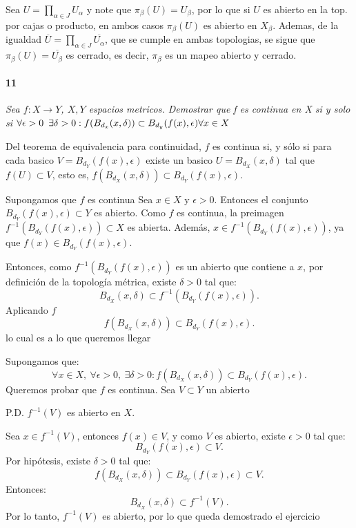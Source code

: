 \documentclass[12pt]{article}
\begin{document}
Sea $U=\prod_{\alpha \in J} U_\alpha$ y note que $\pi_\beta(U)=U_\beta$, por lo que si $U$ es abierto en la top. por cajas o producto, en ambos casos $\pi_\beta(U)$ es abierto en $X_\beta$.
Ademas, de la igualdad $\overline{U}=\prod_{\alpha \in J} \overline{U_\alpha}$, que se cumple en ambas topologias, se sigue que $\pi_\beta(U)=\overline{U_\beta}$ es cerrado, es decir, $\pi_\beta$ es un mapeo abierto y cerrado.
\paragraph{11}
\textit{Sea $f:X \to Y$, $X,Y$ espacios metricos. Demostrar que f es continua en X si y solo si $\forall\epsilon>0\hspace{5px}\exists\delta>0 : f(B_{d_x}(x,\delta))\subset B_{d_y}(f(x),\epsilon) \forall x\in X$}

Del teorema de equivalencia para continuidad, $f$ es continua si, y sólo si para cada basico $V=B_{d_Y}(f(x),\epsilon)$ existe un basico $U=B_{d_X}(x,\delta)$ tal que $f(U) \subset V$, esto es, $f(B_{d_X}(x,\delta)) \subset B_{d_Y}(f(x),\epsilon)$.

\vspace{1em}
Supongamos que \( f \) es continua
Sea \( x \in X \) y \( \epsilon > 0 \). Entonces el conjunto \( B_{d_Y}(f(x), \epsilon) \subset Y \) es abierto.  
Como \( f \) es continua, la preimagen \( f^{-1}(B_{d_Y}(f(x), \epsilon)) \subset X \) es abierta.  
Además, \( x \in f^{-1}(B_{d_Y}(f(x), \epsilon)) \), ya que \( f(x) \in B_{d_Y}(f(x), \epsilon) \).

Entonces, como \( f^{-1}(B_{d_Y}(f(x), \epsilon)) \) es un abierto que contiene a \( x \), por definición de la topología métrica, existe \( \delta > 0 \) tal que:
\[
B_{d_X}(x, \delta) \subset f^{-1}(B_{d_Y}(f(x), \epsilon)).
\]
Aplicando \( f \)
\[
f(B_{d_X}(x, \delta)) \subset B_{d_Y}(f(x), \epsilon).
\]
lo cual es a lo que queremos llegar

\vspace{1em}
Supongamos que:
\[
\forall x \in X,\ \forall \epsilon > 0,\ \exists \delta > 0 : f(B_{d_X}(x, \delta)) \subset B_{d_Y}(f(x), \epsilon).
\]
Queremos probar que \( f \) es continua.  
Sea \( V \subset Y \) un abierto

P.D. \( f^{-1}(V) \) es abierto en \( X \).  

Sea \( x \in f^{-1}(V) \), entonces \( f(x) \in V \), y como \( V \) es abierto, existe \( \epsilon > 0 \) tal que:
\[
B_{d_Y}(f(x), \epsilon) \subset V.
\]
Por hipótesis, existe \( \delta > 0 \) tal que:
\[
f(B_{d_X}(x, \delta)) \subset B_{d_Y}(f(x), \epsilon) \subset V.
\]
Entonces:
\[
B_{d_X}(x, \delta) \subset f^{-1}(V).
\]
Por lo tanto, \( f^{-1}(V) \) es abierto, por lo que queda demostrado el ejercicio
\end{document}
